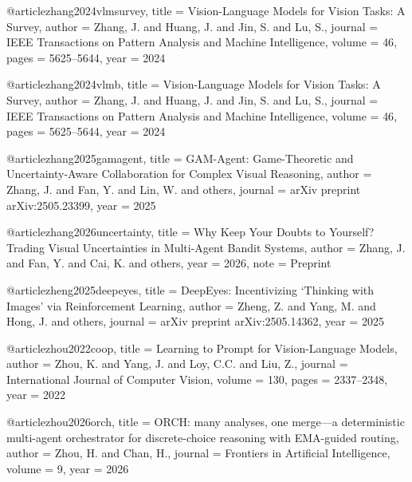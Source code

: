@article{zhang2024vlmsurvey,
  title   = {Vision-Language Models for Vision Tasks: A Survey},
  author  = {Zhang, J. and Huang, J. and Jin, S. and Lu, S.},
  journal = {IEEE Transactions on Pattern Analysis and Machine Intelligence},
  volume  = {46},
  pages   = {5625--5644},
  year    = {2024}
}

@article{zhang2024vlmb,
  title   = {Vision-Language Models for Vision Tasks: A Survey},
  author  = {Zhang, J. and Huang, J. and Jin, S. and Lu, S.},
  journal = {IEEE Transactions on Pattern Analysis and Machine Intelligence},
  volume  = {46},
  pages   = {5625--5644},
  year    = {2024}
}

@article{zhang2025gamagent,
  title   = {{GAM-Agent}: Game-Theoretic and Uncertainty-Aware Collaboration for Complex Visual Reasoning},
  author  = {Zhang, J. and Fan, Y. and Lin, W. and others},
  journal = {arXiv preprint arXiv:2505.23399},
  year    = {2025}
}

@article{zhang2026uncertainty,
  title   = {Why Keep Your Doubts to Yourself? Trading Visual Uncertainties in Multi-Agent Bandit Systems},
  author  = {Zhang, J. and Fan, Y. and Cai, K. and others},
  year    = {2026},
  note    = {Preprint}
}

@article{zheng2025deepeyes,
  title   = {{DeepEyes}: Incentivizing `Thinking with Images' via Reinforcement Learning},
  author  = {Zheng, Z. and Yang, M. and Hong, J. and others},
  journal = {arXiv preprint arXiv:2505.14362},
  year    = {2025}
}

@article{zhou2022coop,
  title   = {Learning to Prompt for Vision-Language Models},
  author  = {Zhou, K. and Yang, J. and Loy, C.C. and Liu, Z.},
  journal = {International Journal of Computer Vision},
  volume  = {130},
  pages   = {2337--2348},
  year    = {2022}
}

@article{zhou2026orch,
  title   = {{ORCH}: many analyses, one merge---a deterministic multi-agent orchestrator for discrete-choice reasoning with {EMA}-guided routing},
  author  = {Zhou, H. and Chan, H.},
  journal = {Frontiers in Artificial Intelligence},
  volume  = {9},
  year    = {2026}
}